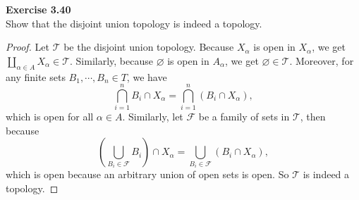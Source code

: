 \documentclass[12pt, a4paper]{article}
\theoremstyle{plain}
\newcommand{\F}{\mathcal{F}}
\newcommand{\T}{\mathcal{T}}
\newenvironment{exercise}[2][Exercise]
    { \begin{mdframed}[backgroundcolor=gray!20] \textbf{#1 #2} \\}
    {  \end{mdframed}}
\begin{document}
	\begin{exercise}{3.40}
	Show that the disjoint union topology is indeed a topology.
	\end{exercise}
		\begin{proof}
		Let $\T$ be the disjoint union topology. Because $X_\alpha$ is open in $X_\alpha$, we get $\coprod_{\alpha\in A}X_\alpha\in \T$. Similarly, because $\varnothing$ is open in $A_\alpha$, we get $\varnothing\in \T$. Moreover, for any finite sets $B_1,\cdots,B_n\in T$, we have 
		\[
		\bigcap_{i=1}^nB_i \cap X_\alpha=\bigcap_{i=1}^n(B_i\cap X_\alpha),
		\] 
		which is open for all $\alpha\in A$. Similarly, let $\F$ be a family of sets in $\T$, then because 
		\[
		\left(\bigcup_{B_i\in\F}B_i\right) \cap X_\alpha=\bigcup_{B_i\in\F}(B_i\cap X_\alpha),
		\]
		which is open because an arbitrary union of open sets is open. So $\T$ is indeed a topology.
		\end{proof}
		
\end{document}
